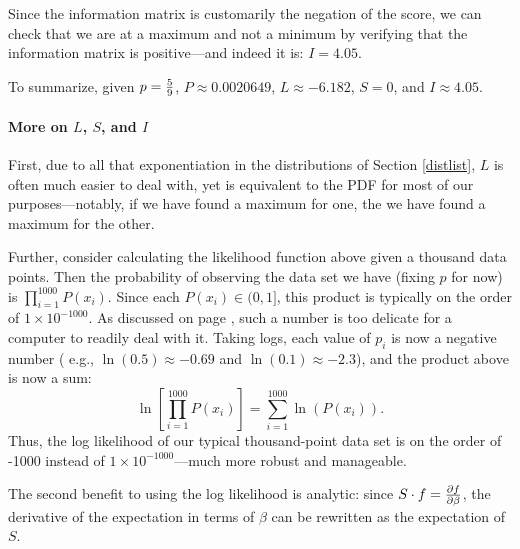 Since the information matrix is customarily the negation of the score,
we can check that we are at a maximum and not a minimum by verifying
that the information matrix is positive---and indeed it is: $I=4.05$.

To summarize, given $p={5\over 9}$, $P\approx 0.0020649$, $L\approx -6.182$, $S=0$,
and $I\approx 4.05$.


\paragraph{More on $L$, $S$, and $I$}
First, due to all that exponentiation in the distributions
of Section \ref{distlist}, $L$ is often much easier to deal with, yet
is equivalent to the PDF for most of our purposes---notably, if we have
found a maximum for one, the we have found a maximum for the other.

\label{precisionfix}
Further, consider calculating the likelihood function above given
a thousand data points.  Then the probability of observing the data set
we have (fixing $p$ for now) is $\prod_{i=1}^{1000} P(x_i)$.  Since each
$P(x_i)\in (0,1]$, this product is typically on the order of $1\times
10^{-1000}$. As discussed on page \pageref{precisionproblem}, such a
number is too delicate for a computer to readily deal with it.
Taking logs, each value of $p_i$ is now a negative
number ( e.g., $\ln(0.5)\approx -0.69$ and $\ln(0.1)\approx -2.3$),  and the
product above is now a sum: $$\ln\left[\prod_{i=1}^{1000} P(x_i)\right]
= \sum_{i=1}^{1000} \ln\left(P(x_i)\right).$$ Thus, the log likelihood of our typical
thousand-point data set is on the order of -1000 instead of $1\times 10^{-1000}$---much
more robust and manageable.

The second benefit to using the log likelihood is analytic: since $S \cdot
f = {\partial f \over \partial \beta}$, the derivative of the expectation
in terms of $\beta$ can be rewritten as the expectation of $S$. 

